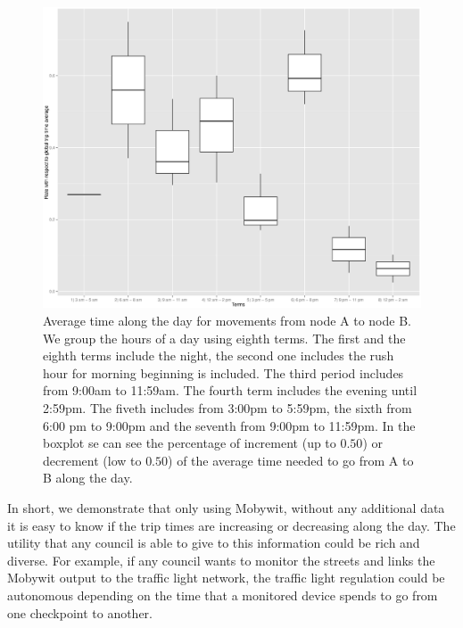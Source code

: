 \documentclass[preprint]{elsarticle}
\begin{document}
\begin{figure}[htb]
	\begin{center}
		\includegraphics[scale=0.4]{imgs/MOSOS/mosos_graph_tiempos.eps}
		\caption{Average time along the day for movements from node A to node B. We group the hours of a day using eighth terms. The first and the eighth terms include the night, the second one includes the rush hour for morning beginning is included. The third period includes from 9:00am to 11:59am. The fourth term includes the evening until 2:59pm. The fiveth includes from 3:00pm to 5:59pm, the sixth from 6:00 pm to 9:00pm and the seventh from 9:00pm to 11:59pm. In the boxplot se can see the percentage of increment (up to $0.50$) or decrement (low to $0.50$) of the average time needed to go from A to B along the day.}
	\label{fig:mososTiempo}
	\end{center}
\end{figure}

In short, we demonstrate that only using Mobywit, without any additional data it is easy to know if the trip times are increasing or decreasing along the day. The utility that any council is able to give to this information could be rich and diverse. For example, if any council wants to monitor the streets and links the Mobywit output to the traffic light network, the traffic light regulation could be autonomous depending on the time that a monitored device spends to go from one checkpoint to another. 

\end{document}
